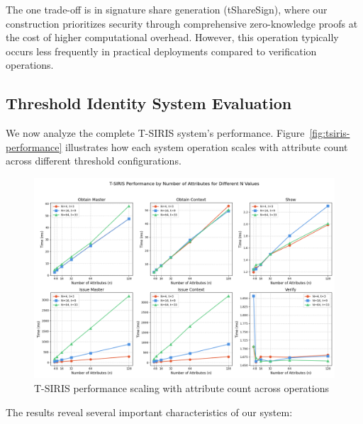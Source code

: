 The one trade-off is in signature share generation (tShareSign), where our construction prioritizes security through comprehensive zero-knowledge proofs at the cost of higher computational overhead. However, this operation typically occurs less frequently in practical deployments compared to verification operations.











\subsection{Threshold Identity System Evaluation}
\label{sec:threshold-performance}

We now analyze the complete T-SIRIS system's performance. Figure~\ref{fig:tsiris-performance} illustrates how each system operation scales with attribute count across different threshold configurations.

\begin{figure}[!htb]
    \centering
    \includegraphics[width=\linewidth]{figures/chap5_tsiris_varyN_varyn_aggregate.png}
    \caption{T-SIRIS performance scaling with attribute count across operations}
    \label{fig:chap5_tsiris_performance}
\end{figure}

The results reveal several important characteristics of our system:

